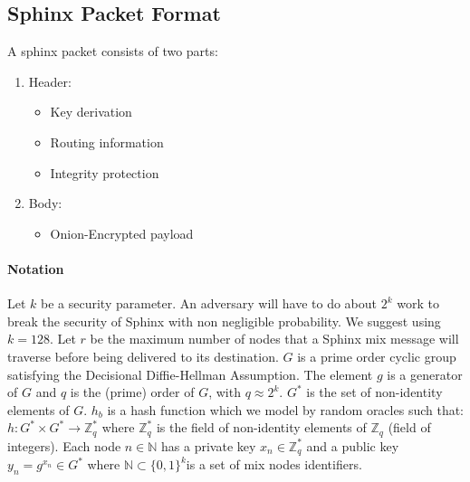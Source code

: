\subsection{Sphinx Packet Format}

A sphinx packet consists of two parts:
\begin{enumerate}
\item Header:
\begin{itemize}
\item Key derivation
\item Routing information
\item Integrity protection
\end{itemize}
\item Body:
\begin{itemize}
\item Onion-Encrypted payload
\end{itemize}
\end{enumerate}
\paragraph{Notation}
Let $k$ be a security parameter. An adversary will have to do about $2^k$ work to break the security of Sphinx with non negligible probability. We suggest using $k=128$.
Let $r$ be the maximum number of nodes that a Sphinx mix message will traverse before being delivered to its destination.
$G$ is a prime order cyclic group satisfying the Decisional Diffie-Hellman Assumption. The element $g$ is a generator of $G$ and $q$ is the (prime) order of $G$, with $q\approx 2^k$.
$G^*$ is the set of non-identity elements of $G$.
$h_b$ is a hash function which we model by random oracles such that:
$h:G^*\times G^*\rightarrow \mathbb{Z}^*_q$ where $\mathbb{Z}^*_q$ is the field of non-identity elements of $\mathbb{Z}_q$ (field of integers).
Each node $n\in \mathbb{N}$ has a private key $x_n\in \mathbb{Z}^*_q$ and a public key $y_n=g^{x_n}\in G^*$ where $\mathbb{N} \subset \{0,1\}^k$is a set of mix nodes identifiers.

